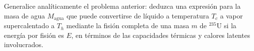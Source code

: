 \item Generalice analíticamente el problema anterior: deduzca una expresión para la masa de agua $M_{\text{agua}}$ que puede convertirse de líquido a temperatura $T_c$ a vapor supercalentado a $T_h$ mediante la fisión completa de una masa $m$ de $^{235}\text{U}$ si la energía por fisión es $E$, en términos de las capacidades térmicas y calores latentes involucrados.